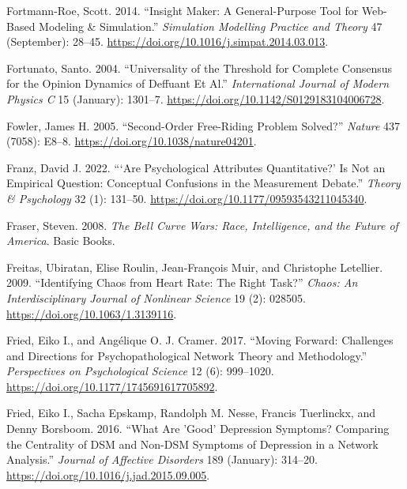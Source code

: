 \documentclass[
  a4paper,
  DIV=11,
  numbers=noendperiod,
  oneside]{scrreprt}
\newlength{\cslhangindent}
\newenvironment{CSLReferences}[2] %
 {\begin{list}{}{%
  \setlength{\itemindent}{0pt}
  \setlength{\leftmargin}{0pt}
  \setlength{\parsep}{0pt}
  \ifodd #1
   \setlength{\leftmargin}{\cslhangindent}
   \setlength{\itemindent}{-1\cslhangindent}
  \fi
  \setlength{\itemsep}{#2\baselineskip}}}
 {\end{list}}
\begin{document}
\begin{CSLReferences}{1}{0}
Fortmann-Roe, Scott. 2014. {``Insight {Maker}: {A} General-Purpose Tool
for Web-Based Modeling \& Simulation.''} \emph{Simulation Modelling
Practice and Theory} 47 (September): 28--45.
\url{https://doi.org/10.1016/j.simpat.2014.03.013}.

Fortunato, Santo. 2004. {``Universality of the {Threshold} for {Complete
Consensus} for the {Opinion Dynamics} of {Deffuant} Et Al.''}
\emph{International Journal of Modern Physics C} 15 (January): 1301--7.
\url{https://doi.org/10.1142/S0129183104006728}.

Fowler, James H. 2005. {``Second-Order Free-Riding Problem Solved?''}
\emph{Nature} 437 (7058): E8--8.
\url{https://doi.org/10.1038/nature04201}.

Franz, David J. 2022. {``{`{Are} Psychological Attributes
Quantitative?'} Is Not an Empirical Question: {Conceptual} Confusions in
the Measurement Debate.''} \emph{Theory \& Psychology} 32 (1): 131--50.
\url{https://doi.org/10.1177/09593543211045340}.

Fraser, Steven. 2008. \emph{The {Bell Curve Wars}: {Race},
{Intelligence}, and the {Future} of {America}}. {Basic Books}.

Freitas, Ubiratan, Elise Roulin, Jean-François Muir, and Christophe
Letellier. 2009. {``Identifying Chaos from Heart Rate: {The} Right
Task?''} \emph{Chaos: An Interdisciplinary Journal of Nonlinear Science}
19 (2): 028505. \url{https://doi.org/10.1063/1.3139116}.

Fried, Eiko I., and Angélique O. J. Cramer. 2017. {``Moving {Forward}:
{Challenges} and {Directions} for {Psychopathological Network Theory}
and {Methodology}.''} \emph{Perspectives on Psychological Science} 12
(6): 999--1020. \url{https://doi.org/10.1177/1745691617705892}.

Fried, Eiko I., Sacha Epskamp, Randolph M. Nesse, Francis Tuerlinckx,
and Denny Borsboom. 2016. {``What Are 'Good' Depression Symptoms?
{Comparing} the Centrality of {DSM} and Non-{DSM} Symptoms of Depression
in a Network Analysis.''} \emph{Journal of Affective Disorders} 189
(January): 314--20. \url{https://doi.org/10.1016/j.jad.2015.09.005}.


\end{CSLReferences}
\end{document}
